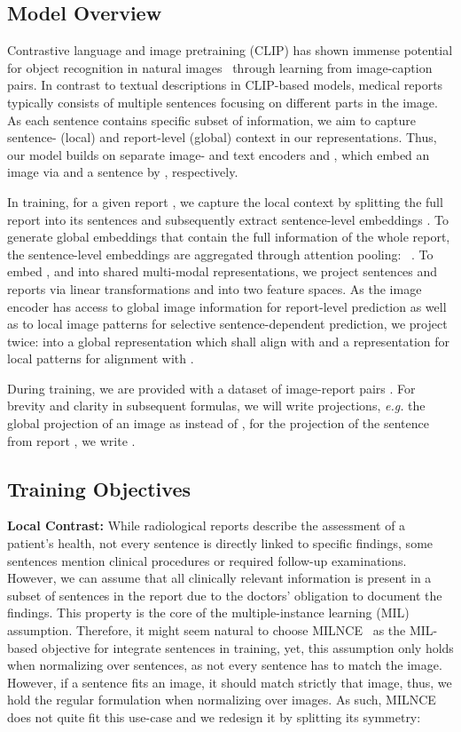 \documentclass[runningheads]{llncs}
\begin{document}
\subsection{Model Overview}
Contrastive language and image pretraining (CLIP) has shown immense potential for object recognition in natural images~\cite{radford2021learning} through learning from image-caption pairs. In contrast to textual descriptions in CLIP-based models, medical reports typically consists of multiple sentences focusing on different parts in the image. As each sentence contains specific subset of information, we aim to capture sentence- (local) and report-level (global)  context in our representations.
Thus, our model builds on separate image- and text encoders  and , which embed an image  via  and a sentence by , respectively. 

In training, for a given report , we capture the local context by splitting the full report into its sentences  and subsequently extract sentence-level embeddings . To generate global embeddings that contain the full information of the whole report, the sentence-level embeddings are aggregated through attention pooling: ~\cite{NIPS2017_3f5ee243}.
To embed ,  and  into shared multi-modal representations, we project sentences and reports via linear transformations  and  into two feature spaces.
As the image encoder has access to global image information for report-level prediction as well as to local image patterns for selective sentence-dependent prediction, we project  twice: into a global representation  which shall align with  and a representation for local patterns  for alignment with . 


During training, we are provided with a dataset of image-report pairs .
For brevity and clarity in subsequent formulas, we will write projections, \textit{e.g.} the global projection of an image  as  instead of , for the projection of the  sentence from report , we write .

\subsection{Training Objectives}

\noindent\textbf{Local Contrast:} While radiological reports describe the assessment of a patient's health, not every sentence is directly linked to specific findings, some sentences mention clinical procedures or required follow-up examinations.
However, we can assume that all clinically relevant information is present in a subset of sentences in the report due to the doctors' obligation to document the findings.
This property is the core of the multiple-instance learning (MIL) assumption. 
Therefore, it might seem natural to choose MILNCE~\cite{miech2020end} as the MIL-based objective for integrate sentences in training, yet, this assumption only holds when normalizing over sentences, as not every sentence has to match the image. However, if a sentence fits an image, it should match strictly that image, thus, we hold the regular formulation when normalizing over images.
As such, MILNCE does not quite fit this use-case and we redesign it by splitting its symmetry:
\end{document}
